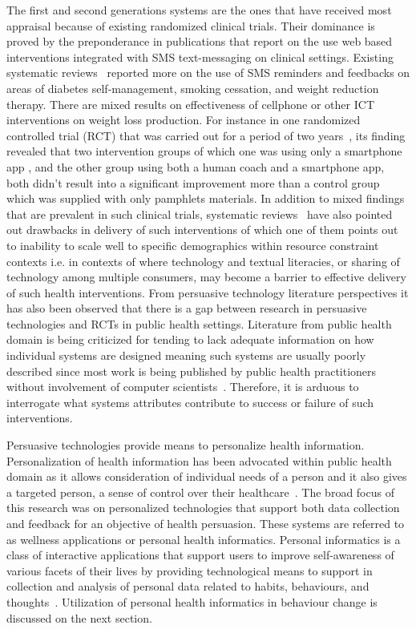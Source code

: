 The first and second generations systems are the ones that have received most appraisal because of existing randomized clinical trials. Their dominance is proved by the preponderance in publications that report on the use web based interventions integrated with SMS text-messaging on clinical settings. Existing systematic reviews~\citep{cole2010text,fjeldsoe2009behavior,krishna2009healthcare} reported more on the use of SMS reminders and feedbacks on areas of diabetes self-management, smoking cessation, and weight reduction therapy. There are mixed results on effectiveness of cellphone or other ICT interventions on weight loss production. For instance in one randomized controlled trial (RCT) that was carried out for a period of two years~\citep{svetkey2015cell}, its finding revealed that two intervention groups of which one was using only a smartphone app , and the other group using both a human coach and a smartphone app, both didn't result into a significant improvement more than a control group which was supplied with only pamphlets materials. In addition to mixed findings that are prevalent in such clinical trials, systematic reviews~\citep{cole2010text,kaplan2006can} have also pointed out drawbacks in delivery of such interventions of which one of them points out to inability to scale well to specific demographics within resource constraint contexts i.e. in contexts of where technology and textual literacies, or sharing of technology among multiple consumers, may become a barrier to effective delivery of such health interventions. From persuasive technology literature perspectives it has also been observed that there is a gap between research in persuasive technologies and RCTs in public health settings. Literature from public health domain is being criticized for tending to lack adequate information on how individual systems are designed meaning such systems are usually poorly described since most work is being published by public health practitioners without involvement of computer scientists~\citep{Oinas-Kukkonen:foundation}. Therefore, it is arduous to interrogate what systems attributes contribute to success or failure of such interventions. 

Persuasive technologies provide means to personalize health information. Personalization of health information has been advocated within public health domain as it allows consideration of individual needs of a person and it also gives a targeted person, a  sense of control over their healthcare~\citep{mccallum2012gamification}. The broad focus of this research was on  personalized technologies that support both  data collection and feedback for an objective of health persuasion. These systems are referred to as wellness applications or personal health informatics. Personal informatics is a class of interactive applications that support users to improve self-awareness of various facets of their lives by providing technological means to support in collection and analysis of personal data related to habits, behaviours, and thoughts~\citep{li2011personal,li2012personal}. Utilization of personal health informatics in behaviour change is discussed on the next section. 
